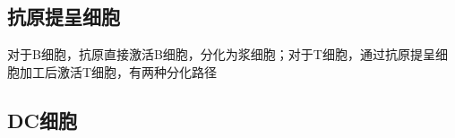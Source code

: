 \subsection{抗原提呈细胞}%
\label{sub:抗原提呈细胞}
对于B细胞，抗原直接激活B细胞，分化为浆细胞；对于T细胞，通过抗原提呈细胞加工后激活T细胞，有两种分化路径
\subsection{DC细胞}%
\label{sub:DC细胞}
